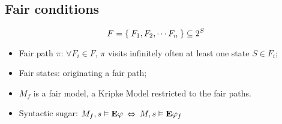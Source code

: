 \subsection{Fair conditions}

\[
    F = \Set{ F_1, F_2, \cdots F_n } \subseteq 2^S
\]

\begin{itemize}
\item   Fair path $\pi$: $\forall F_i \in F$, $\pi$ visits infinitely
        often at least one state $S \in F_i$;
\item   Fair states: originating a fair path;
\item   $M_f$ is a fair model, a Kripke Model restricted to the fair
        paths.
\item   Syntactic sugar: $M_f,s \vDash \mathcal{\mathcal{\sf \bf E}}\varphi
        \:\Leftrightarrow\: M,s \vDash \mathcal{\mathcal{\sf \bf E}}\varphi_f$
\end{itemize}

